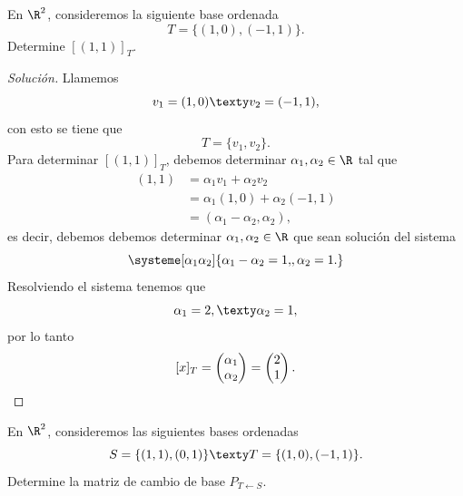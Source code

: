 \documentclass[a4,11pt]{aleph-notas}
\begin{document}
\encabezado

\begin{ejer}
    En $\R^2$, consideremos la siguiente base ordenada
    \[
        T = \{(1,0),(-1,1)\}.
    \]
    Determine $[(1,1)]_T$.
\end{ejer}


\begin{proof}[Solución]
    Llamemos
    \[
        v_1 = (1,0)\texty
        v_2 = (-1,1),
    \]
    con esto se tiene que
    \[
        T = \{v_1,v_2\}.
    \]
    Para determinar $[(1,1)]_T$, debemos determinar $\alpha_1,\alpha_2\in\R$ tal que 
    \begin{align*}
        (1,1) & = \alpha_1 v_1+\alpha_2 v_2 \\
        & = \alpha_1 (1,0)+\alpha_2(-1,1)\\
        & = (\alpha_1-\alpha_2,\alpha_2),
    \end{align*}
    es decir, debemos debemos determinar $\alpha_1,\alpha_2\in\R$ que sean solución del sistema
    \[
        \systeme[\alpha_1\alpha_2]{
        \alpha_1 - \alpha_2 = 1{,},
        \alpha_2 = 1{.}
        }
    \]
    Resolviendo el sistema tenemos que
    \[
        \alpha_1 = 2,\texty
        \alpha_2 = 1,
    \]
    por lo tanto
    \[
        [x]_T 
        = \begin{pmatrix} \alpha_1\\ \alpha_2 \end{pmatrix}
        = \begin{pmatrix} 2\\ 1  \end{pmatrix}.\qedhere
    \]
\end{proof}




\begin{ejer}
    En $\R^2$, consideremos las siguientes bases ordenadas
    \[
        S = \{(1,1),(0,1)\}
        \texty
        T = \{(1,0),(-1,1)\}.
    \]
    Determine la matriz de cambio de base $P_{T \leftarrow S}$.
\end{ejer}
\end{document}
